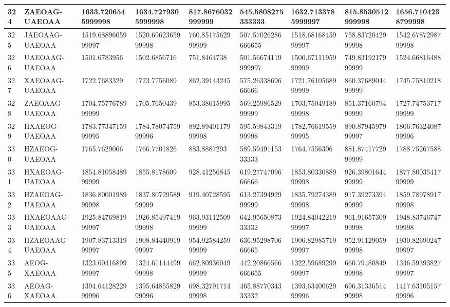 {\begin{longtable}{|l|l|l|l|l|l|l|l|l|}
        324 & ZAEOAG-UAEOAA & 1633.7206545999998 & 1634.7279305999998 & 817.8676032999999 & 545.5808275333333 & 1632.7133785999997 & 815.8530512999998 & 1656.7104238799998 \\ \hline
        325 & JAEOAAG-UAEOAA & 1519.6889605999997 & 1520.6962365999998 & 760.8517562999999 & 507.57026286666655 & 1518.6816845999997 & 758.8372042999998 & 1542.6787298799998 \\ \hline
        326 & UAEOAAG-UAEOAA & 1501.6783956 & 1502.6856716 & 751.8464738 & 501.56674119999997 & 1500.6711195999999 & 749.8319217999999 & 1524.66816488 \\ \hline
        327 & XAEOAAG-UAEOAA & 1722.7683329 & 1723.7756089 & 862.39144245 & 575.2633869666666 & 1721.7610568999999 & 860.3768904499999 & 1745.75810218 \\ \hline
        328 & ZAEOAAG-UAEOAA & 1704.7577678999999 & 1705.7650439 & 853.38615995 & 569.2598652999999 & 1703.7504918999998 & 851.3716079499999 & 1727.7475371799999 \\ \hline
        329 & HXAEOG-UAEOAA & 1783.7734715999995 & 1784.7807475999996 & 892.8940117999998 & 595.5984331999998 & 1782.7661955999995 & 890.8794597999997 & 1806.7632408799996 \\ \hline
        330 & HZAEOG-UAEOAA & 1765.7629066 & 1766.7701826 & 883.8887293 & 589.5949115333333 & 1764.7556306 & 881.8741772999999 & 1788.75267588 \\ \hline
        331 & HXAEOAG-UAEOAA & 1854.8105848999999 & 1855.8178609 & 928.41256845 & 619.2774709666666 & 1853.8033088999998 & 926.3980164499999 & 1877.8003541799999 \\ \hline
        332 & HZAEOAG-UAEOAA & 1836.8000198999998 & 1837.8072958999999 & 919.40728595 & 613.2739492999999 & 1835.7927438999998 & 917.3927339499999 & 1859.7897891799998 \\ \hline
        333 & HXAEOAAG-UAEOAA & 1925.8476981999997 & 1926.8549741999998 & 963.9311250999999 & 642.9565087333332 & 1924.8404221999997 & 961.9165730999998 & 1948.8374674799998 \\ \hline
        334 & HZAEOAAG-UAEOAA & 1907.8371331999997 & 1908.8444091999997 & 954.9258425999999 & 636.9529870666665 & 1906.8298571999997 & 952.9112905999998 & 1930.8269024799997 \\ \hline
        335 & AEOG-XAEOAA & 1323.6041689999997 & 1324.6114449999998 & 662.8093604999999 & 442.20866566666655 & 1322.5968929999997 & 660.7948084999998 & 1346.5939382799997 \\ \hline
        336 & AEOAG-XAEOAA & 1394.6412822999996 & 1395.6485582999996 & 698.3279171499998 & 465.8877034333332 & 1393.6340062999996 & 696.3133651499998 & 1417.6310515799996 \\ \hline

\end{longtable}}

